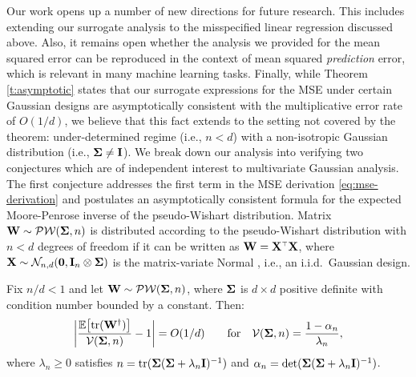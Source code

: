 \documentclass[11pt]{article}
\begin{document}
Our work opens up a number of new directions for future research.
This includes extending our surrogate analysis to the
misspecified linear regression discussed above.
Also, it remains open whether the analysis we provided for the mean
squared error can be reproduced in the context of mean squared
\emph{prediction} error, which is relevant in many machine learning
tasks. Finally, while Theorem \ref{t:asymptotic} states that our surrogate
expressions for the MSE under certain Gaussian designs are
asymptotically consistent with the multiplicative error rate of
$O(1/d)$, we believe that this fact extends to
the setting not covered by the theorem: under-determined regime (i.e.,
$n<d$) with a non-isotropic Gaussian distribution (i.e., $\mathbf{\Sigma}\neq
\mathbf I$). We break down our analysis into verifying two
conjectures which are of independent interest to multivariate
Gaussian analysis. The first conjecture addresses the first term in
the MSE derivation \eqref{eq:mse-derivation} and postulates an asymptotically
consistent formula for the expected Moore-Penrose inverse
of the pseudo-Wishart distribution. Matrix
$\mathbf W\sim\mathcal{P}\mathcal{W}(\mathbf{\Sigma},n)$ is distributed according to the pseudo-Wishart
distribution with $n<d$ degrees of freedom \citep{srivastava1979introduction} if it can be written as
$\W=\X^\top\X$, where $\mathbf X\sim\mathcal{N}_{n,d}(\mathbf 0, \mathbf I_n \otimes \mathbf{\Sigma})$
is the matrix-variate Normal \citep{gupta2018matrix}, i.e., an
i.i.d.~Gaussian design.
\ifisarxiv\pagebreak\fi
\begin{conjecture}\label{c:wishart}
  Fix $n/d<1$ and let $\mathbf W\sim\mathcal{P}\mathcal{W}(\mathbf{\Sigma},n )$, where
$\mathbf{\Sigma}$ is $d\times d$ positive definite with condition number bounded by a constant.
Then:
\begin{align}
\bigg|\frac{\mathbb E\big[\mathrm{tr}(\mathbf W^\dagger)\big]}{\mathcal{V}(\mathbf{\Sigma},n)} -1\bigg|=
  O(1/d)\qquad\text{for}\quad\mathcal{V}(\mathbf{\Sigma},n)=\frac{1-\alpha_n}{\lambda_n},\label{eq:wishart}
\end{align}
where $\lambda_n\geq 0$ satisfies $n=\mathrm{tr}(\mathbf{\Sigma}(\mathbf{\Sigma}+\lambda_n\mathbf I)^{-1})$ and
$\alpha_n=\det(\mathbf{\Sigma}(\mathbf{\Sigma}+\lambda_n\mathbf I)^{-1})$.
\end{conjecture}
\end{document}
